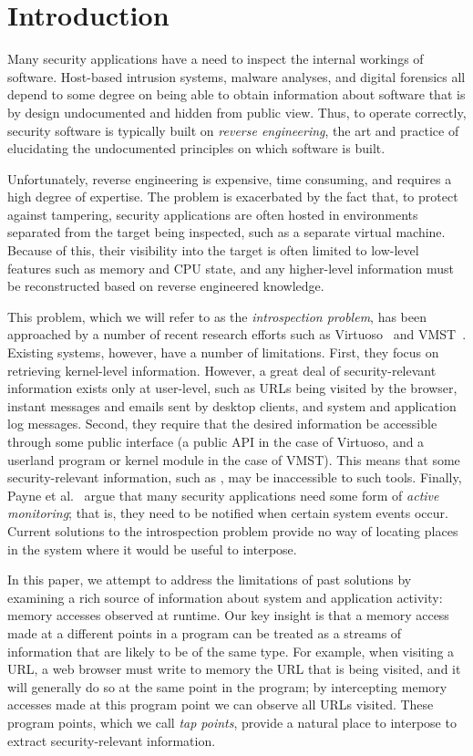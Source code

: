 \section{Introduction}
\label{sec:introduction}

Many security applications have a need to inspect the internal workings
of software. Host-based intrusion systems, malware analyses, and
digital forensics all depend to some degree on being able to obtain
information about software that is by design undocumented and hidden
from public view. Thus, to operate correctly, security software is
typically built on \emph{reverse engineering}, the art and practice of
elucidating the undocumented principles on which software is built.

Unfortunately, reverse engineering is expensive, time consuming, and
requires a high degree of expertise. The problem is exacerbated by the
fact that, to protect against tampering, security applications are often
hosted in environments separated from the target being inspected, such
as a separate virtual machine. Because of this, their visibility into
the target is often limited to low-level features such as memory and CPU
state, and any higher-level information must be reconstructed based on
reverse engineered knowledge.

This problem, which we will refer to as the \emph{introspection
problem}, has been approached by a number of recent research efforts
such as Virtuoso~\cite{Dolan-Gavitt:2011uq} and VMST~\cite{Fu:2012fk}.
Existing systems, however, have a number of limitations. First, they
focus on retrieving kernel-level information. However, a great deal of
security-relevant information exists only at user-level, such as URLs
being visited by the browser, instant messages and emails sent by
desktop clients, and system and application log messages. Second,
they require that the desired information be accessible through some
public interface (a public API in the case of Virtuoso, and a userland
program or kernel module in the case of VMST). This means that some
security-relevant information, such as , may be
inaccessible to such tools. Finally, Payne et al.~\cite{payne:2008}
argue that many security applications need some form of \emph{active
monitoring}; that is, they need to be notified when certain system
events occur. Current solutions to the introspection problem provide no
way of locating places in the system where it would be useful to
interpose.

In this paper, we attempt to address the limitations of past solutions
by examining a rich source of information about system and application
activity: memory accesses observed at runtime. Our key insight is that a
memory access made at a different points in a program can be treated as
a streams of information that are likely to be of the same type. For
example, when visiting a URL, a web browser must write to memory the URL
that is being visited, and it will generally do so at the same point in
the program; by intercepting memory accesses made at this program point
we can observe all URLs visited. These program points, which we call
\emph{tap points}, provide a natural place to interpose to extract
security-relevant information.

